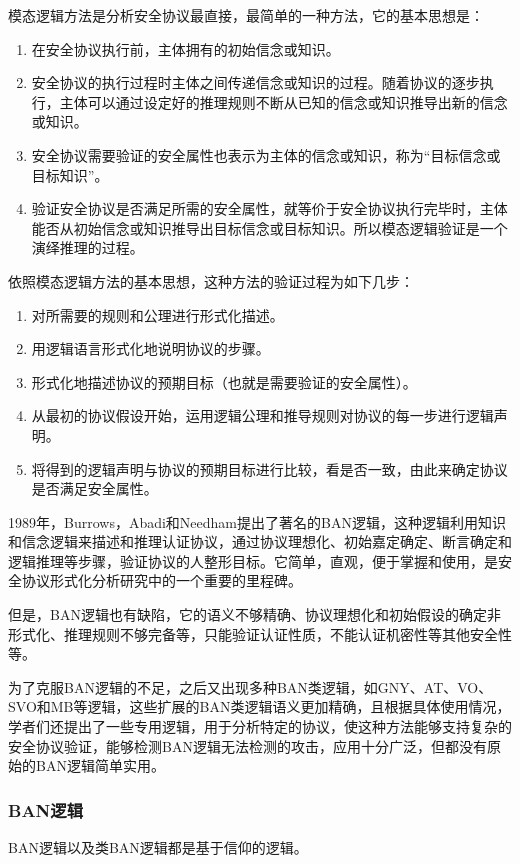\documentclass[cs4size,a4pape,UTF8]{ctexart}
\numberwithin{equation}{section}
\numberwithin{table}{section}
\numberwithin{figure}{section}
\begin{document}
模态逻辑方法是分析安全协议最直接，最简单的一种方法，它的基本思想是：

\begin{enumerate}[(1)]
\item 在安全协议执行前，主体拥有的初始信念或知识。
\item 安全协议的执行过程时主体之间传递信念或知识的过程。随着协议的逐步执行，主体可以通过设定好的推理规则不断从已知的信念或知识推导出新的信念或知识。
\item 安全协议需要验证的安全属性也表示为主体的信念或知识，称为“目标信念或目标知识”。
\item 验证安全协议是否满足所需的安全属性，就等价于安全协议执行完毕时，主体能否从初始信念或知识推导出目标信念或目标知识。所以模态逻辑验证是一个演绎推理的过程。
\end{enumerate}

依照模态逻辑方法的基本思想，这种方法的验证过程为如下几步：

\begin{enumerate}[(1)]
\item 对所需要的规则和公理进行形式化描述。
\item 用逻辑语言形式化地说明协议的步骤。
\item 形式化地描述协议的预期目标（也就是需要验证的安全属性）。
\item 从最初的协议假设开始，运用逻辑公理和推导规则对协议的每一步进行逻辑声明。
\item 将得到的逻辑声明与协议的预期目标进行比较，看是否一致，由此来确定协议是否满足安全属性。
\end{enumerate}

1989年，Burrows，Abadi和Needham提出了著名的BAN逻辑，这种逻辑利用知识和信念逻辑来描述和推理认证协议，通过协议理想化、初始嘉定确定、断言确定和逻辑推理等步骤，验证协议的人整形目标。它简单，直观，便于掌握和使用，是安全协议形式化分析研究中的一个重要的里程碑\cite{2}。

但是，BAN逻辑也有缺陷，它的语义不够精确、协议理想化和初始假设的确定非形式化、推理规则不够完备等，只能验证认证性质，不能认证机密性等其他安全性等\cite{2}。

为了克服BAN逻辑的不足，之后又出现多种BAN类逻辑，如GNY、AT、VO、SVO和MB等逻辑，这些扩展的BAN类逻辑语义更加精确，且根据具体使用情况，学者们还提出了一些专用逻辑，用于分析特定的协议，使这种方法能够支持复杂的安全协议验证，能够检测BAN逻辑无法检测的攻击，应用十分广泛，但都没有原始的BAN逻辑简单实用。


\subsubsection{BAN逻辑}
BAN逻辑以及类BAN逻辑都是基于信仰的逻辑。
\end{document}
